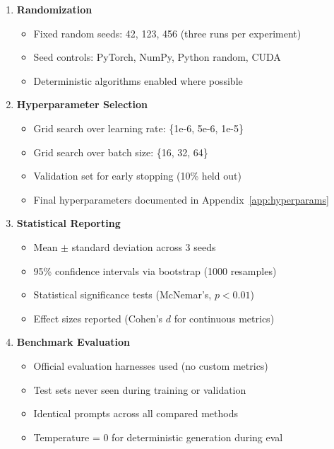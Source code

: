 \documentclass[12pt,a4paper]{report}
\theoremstyle{definition}
\begin{document}
\begin{enumerate}[leftmargin=*]
    \item \textbf{Randomization}
    \begin{itemize}[nosep]
        \item[$\square$] Fixed random seeds: 42, 123, 456 (three runs per experiment)
        \item[$\square$] Seed controls: PyTorch, NumPy, Python random, CUDA
        \item[$\square$] Deterministic algorithms enabled where possible
    \end{itemize}

    \item \textbf{Hyperparameter Selection}
    \begin{itemize}[nosep]
        \item[$\square$] Grid search over learning rate: \{1e-6, 5e-6, 1e-5\}
        \item[$\square$] Grid search over batch size: \{16, 32, 64\}
        \item[$\square$] Validation set for early stopping (10\% held out)
        \item[$\square$] Final hyperparameters documented in Appendix~\ref{app:hyperparams}
    \end{itemize}

    \item \textbf{Statistical Reporting}
    \begin{itemize}[nosep]
        \item[$\square$] Mean $\pm$ standard deviation across 3 seeds
        \item[$\square$] 95\% confidence intervals via bootstrap (1000 resamples)
        \item[$\square$] Statistical significance tests (McNemar's, $p < 0.01$)
        \item[$\square$] Effect sizes reported (Cohen's $d$ for continuous metrics)
    \end{itemize}

    \item \textbf{Benchmark Evaluation}
    \begin{itemize}[nosep]
        \item[$\square$] Official evaluation harnesses used (no custom metrics)
        \item[$\square$] Test sets never seen during training or validation
        \item[$\square$] Identical prompts across all compared methods
        \item[$\square$] Temperature = 0 for deterministic generation during eval
    \end{itemize}


\end{enumerate}
\end{document}
